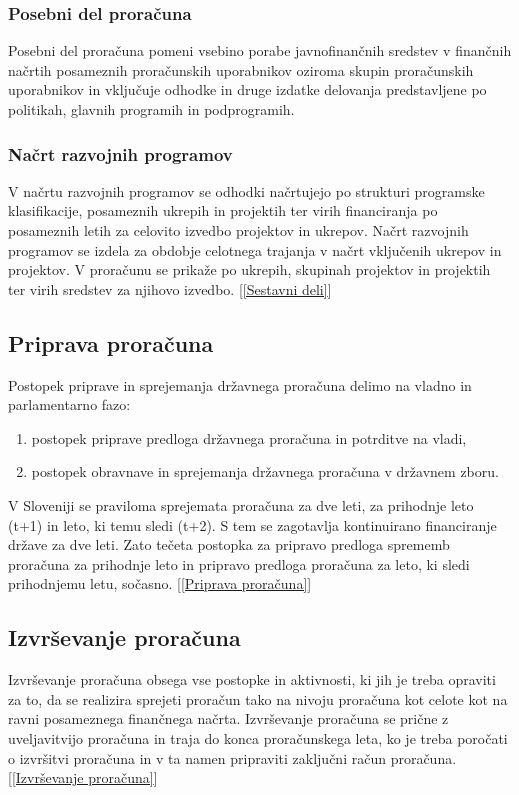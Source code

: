 \documentclass[12pt, a4paper]{article}
\begin{document}
\subsubsection[Posebni del proračuna]{Posebni del proračuna}
Posebni del proračuna pomeni vsebino porabe javnofinančnih sredstev v finančnih načrtih posameznih proračunskih uporabnikov oziroma skupin proračunskih uporabnikov in vključuje odhodke in druge izdatke delovanja predstavljene po politikah, glavnih programih in podprogramih. 

\subsubsection[Načrt razvojnih programov]{Načrt razvojnih programov}
V načrtu razvojnih programov se odhodki načrtujejo po strukturi programske klasifikacije, posameznih ukrepih in projektih ter virih financiranja po posameznih letih za celovito izvedbo projektov in ukrepov. Načrt razvojnih programov se izdela za obdobje celotnega trajanja v načrt vključenih ukrepov in projektov. V proračunu se prikaže po ukrepih, skupinah projektov in projektih ter virih sredstev za njihovo izvedbo. [\ref{Sestavni deli}]

\subsection[Priprava proračuna]{Priprava proračuna}
Postopek priprave in sprejemanja državnega proračuna delimo na vladno in parlamentarno fazo:
\begin{enumerate}
\item postopek priprave predloga državnega proračuna in potrditve na vladi,
\item postopek obravnave in sprejemanja državnega proračuna v državnem zboru.
\end{enumerate}
V Sloveniji se praviloma sprejemata proračuna za dve leti, za prihodnje leto (t+1) in leto, ki temu sledi (t+2). S tem se zagotavlja kontinuirano financiranje države za dve leti. Zato tečeta postopka za pripravo predloga sprememb proračuna za prihodnje leto in pripravo predloga proračuna za leto, ki sledi prihodnjemu letu, sočasno. [\ref{Priprava proračuna}]

\subsection[Izvrševanje proračuna]{Izvrševanje proračuna}
Izvrševanje proračuna obsega vse postopke in aktivnosti, ki jih je treba opraviti za to, da se realizira sprejeti proračun tako na nivoju proračuna kot celote kot na ravni posameznega finančnega načrta. Izvrševanje proračuna se prične z uveljavitvijo proračuna in traja do konca proračunskega leta, ko je treba poročati o izvršitvi proračuna in v ta namen pripraviti zaključni račun proračuna. [\ref{Izvrševanje proračuna}]
\end{document}
